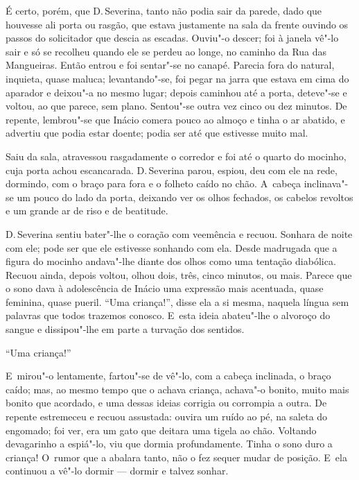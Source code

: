 \begin{linenumbers}
É certo, porém, que D.\,Severina, tanto não podia sair da parede, dado
que houvesse ali porta ou rasgão, que estava justamente na sala da
frente ouvindo os passos do solicitador que descia as escadas. Ouviu"-o
descer; foi à janela vê"-lo sair e só se recolheu quando ele se perdeu ao
longe, no caminho da Rua das Mangueiras. Então entrou e foi sentar"-se no
canapé. Parecia fora do natural, inquieta, quase maluca; levantando"-se,
foi pegar na jarra que estava em cima do aparador e deixou"-a no mesmo
lugar; depois caminhou até a porta, deteve"-se e voltou, ao que parece,
sem plano. Sentou"-se outra vez cinco ou dez minutos. De repente,
lembrou"-se que Inácio comera pouco ao almoço e tinha o ar abatido, e
advertiu que podia estar doente; podia ser até que estivesse muito mal.

Saiu da sala, atravessou rasgadamente o corredor e foi até o quarto do
mocinho, cuja porta achou escancarada. D.\,Severina parou, espiou, deu
com ele na rede, dormindo, com o braço para fora e o folheto caído no
chão. A~cabeça inclinava"-se um pouco do lado da porta, deixando ver os
olhos fechados, os cabelos revoltos e um grande ar de riso e de
beatitude.

D.\,Severina sentiu bater"-lhe o coração com veemência e recuou. Sonhara
de noite com ele; pode ser que ele estivesse sonhando com ela. Desde
madrugada que a figura do mocinho andava"-lhe diante dos olhos como uma
tentação diabólica. Recuou ainda, depois voltou, olhou dois, três, cinco
minutos, ou mais. Parece que o sono dava à adolescência de Inácio uma
expressão mais acentuada, quase feminina, quase pueril. ``Uma
criança!'', disse ela a si mesma, naquela língua sem palavras que todos
trazemos conosco. E~esta ideia abateu"-lhe o alvoroço do sangue e
dissipou"-lhe em parte a turvação dos sentidos.

``Uma criança!''

E~mirou"-o lentamente, fartou"-se de vê"-lo, com a cabeça inclinada, o
braço caído; mas, ao mesmo tempo que o achava criança, achava"-o bonito,
muito mais bonito que acordado, e uma dessas ideias corrigia ou
corrompia a outra. De repente estremeceu e recuou assustada: ouvira um
ruído ao pé, na saleta do engomado; foi ver, era um gato que deitara uma
tigela ao chão. Voltando devagarinho a espiá"-lo, viu que dormia
profundamente. Tinha o sono duro a criança! O~rumor que a abalara tanto,
não o fez sequer mudar de posição. E~ela continuou a vê"-lo dormir ---
dormir e talvez sonhar.


\end{linenumbers}
